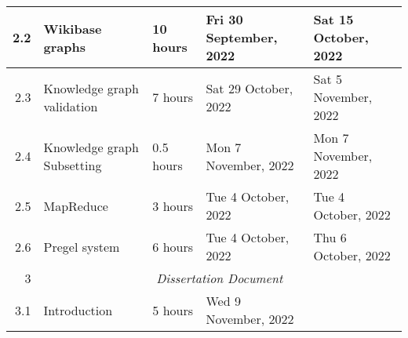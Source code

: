 \documentclass{standalone}
\begin{document}
\begin{tabular}{|r|llll|}
    2.2                                                           & \multicolumn{1}{l|}{Wikibase graphs}                            & \multicolumn{1}{l|}{10 hours}                                  & \multicolumn{1}{l|}{Fri 30 September, 2022}                 & Sat 15 October, 2022                                         \\ \hline
    2.3                                                           & \multicolumn{1}{l|}{Knowledge graph validation}                 & \multicolumn{1}{l|}{7 hours}                                   & \multicolumn{1}{l|}{Sat 29 October, 2022}                   & Sat 5 November, 2022                                         \\ \hline
    2.4                                                           & \multicolumn{1}{l|}{Knowledge graph Subsetting}                 & \multicolumn{1}{l|}{0.5 hours}                                 & \multicolumn{1}{l|}{Mon 7 November, 2022}                   & Mon 7 November, 2022                                         \\ \hline
    2.5                                                           & \multicolumn{1}{l|}{MapReduce}                                  & \multicolumn{1}{l|}{3 hours}                                   & \multicolumn{1}{l|}{Tue 4 October, 2022}                    & Tue 4 October, 2022                                          \\ \hline
    2.6                                                           & \multicolumn{1}{l|}{Pregel system}                              & \multicolumn{1}{l|}{6 hours}                                   & \multicolumn{1}{l|}{Tue 4 October, 2022}                    & Thu 6 October, 2022                                          \\ \hline
    3                                                             & \multicolumn{4}{c|}{\textit{Dissertation Document}}                                                                                                                                                                                                           \\ \hline
    3.1                                                           & \multicolumn{1}{l|}{Introduction}                               & \multicolumn{1}{l|}{5 hours}                                   & \multicolumn{1}{l|}{Wed 9 November, 2022}                   &                                                              \\ \hline

\end{tabular}
\end{document}
